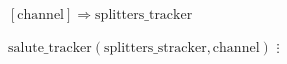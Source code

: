 \documentclass{article}
\begin{document}
\pagestyle{empty}

\newcommand{\send}{\Rightarrow}
\newcommand{\sendto}{\rightarrow}
\newcommand{\recv}{\Leftarrow}
\algrenewcommand\textproc{\textrm}

\begin{algorithmic}

  \algrenewcommand{}

  \State $[\text{channel}] \send \text{splitters\_tracker}$
  \EndFunction

  \State $\text{salute\_tracker}(\text{splitters\_stracker}, \text{channel})$
  \State $\vdots$
  \EndFunction
  
  \EndProcedure
\end{algorithmic}
\end{document}
